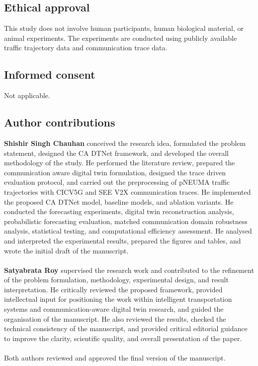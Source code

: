 \documentclass[pdflatex,sn-mathphys-num]{sn-jnl}%
\theoremstyle{thmstyleone}%
\theoremstyle{thmstyletwo}%
\theoremstyle{thmstylethree}%
\begin{document}
\subsection*{Ethical approval}

This study does not involve human participants, human biological material, or animal experiments. The experiments are conducted using publicly available traffic trajectory data and communication trace data.

\subsection*{Informed consent}

Not applicable.

\subsection*{Author contributions}

\textbf{Shishir Singh Chauhan} conceived the research idea, formulated the problem statement, designed the CA DTNet framework, and developed the overall methodology of the study. He performed the literature review, prepared the communication aware digital twin formulation, designed the trace driven evaluation protocol, and carried out the preprocessing of pNEUMA traffic trajectories with CICV5G and SEE V2X communication traces. He implemented the proposed CA DTNet model, baseline models, and ablation variants. He conducted the forecasting experiments, digital twin reconstruction analysis, probabilistic forecasting evaluation, matched communication domain robustness analysis, statistical testing, and computational efficiency assessment. He analysed and interpreted the experimental results, prepared the figures and tables, and wrote the initial draft of the manuscript.\\\\
\textbf{Satyabrata Roy} supervised the research work and contributed to the refinement of the problem formulation, methodology, experimental design, and result interpretation. He critically reviewed the proposed framework, provided intellectual input for positioning the work within intelligent transportation systems and communication-aware digital twin research, and guided the organisation of the manuscript. He also reviewed the results, checked the technical consistency of the manuscript, and provided critical editorial guidance to improve the clarity, scientific quality, and overall presentation of the paper.\\\\
Both authors reviewed and approved the final version of the manuscript.
\end{document}
